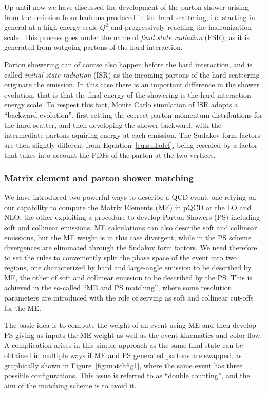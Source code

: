 Up until now we have discussed the development of the parton shower arising
from the emission from hadrons produced in the hard scattering, i.e. 
starting in general at a high energy scale $Q^2$ and progressively
reaching the hadronization scale. This process goes under the name of
{\it final state radiation} (FSR), as it is generated from outgoing
partons of the hard interaction.

Parton showering can of course also happen before the hard interaction, and
is called {\it initial state radiation} (ISR) as the incoming partons
of the hard scattering originate the emission. In this case
there is an important difference in the shower evolution, that is
that the final energy of the showering is the hard interaction energy
scale. To respect this fact, Monte Carlo simulation of ISR adopts a 
``backward evolution'', first setting the correct parton momentum distributions
for the hard scatter, and then developing the shower backward, with the 
intermediate partons aquiring energy at each emission. The Sudakov form 
factors are then slightly different from Equation~\ref{eq:sudadef}, being
rescaled by a factor that takes into account the PDFs of the parton at the
two vertices.


\subsubsection{Matrix element and parton shower matching}\label{sec:matching}

We have introduced two powerful ways to describe a QCD event, one relying
on our capability to compute the Matrix Elements (ME) in pQCD at the LO and NLO,
the other exploiting a procedure to develop Parton Showers (PS) including
soft and collinear emissions. ME calculations can also describe soft and collinear emissions,
but the ME weight is in this case divergent, while in the PS scheme divergences
are eliminated through the Sudakov form factors. We need therefore to set 
the rules to conveniently split the phase space of the event into two regions,
one characterized by hard and large-angle emission to be described by ME, the
other of soft and collinear emission to be described by the PS. This is achieved
in the so-called ``ME and PS matching'', where some resolution parameters are
introduced with the role of serving as soft and collinear cut-offs for the ME. 

The basic idea is to compute the weight of an event using ME and then
develop PS giving as inputs the ME weight as well as the event kinematics and 
color flow. A complication arises in this simple approach as the same final
state can be obtained in multiple ways if ME and PS generated partons are swapped,
as graphically shown in Figure~\ref{fig:matchfig1}, where the same event 
has three possible configurations. This issue is referred to as ``double
counting'', and the aim of the matching scheme is to avoid it.

